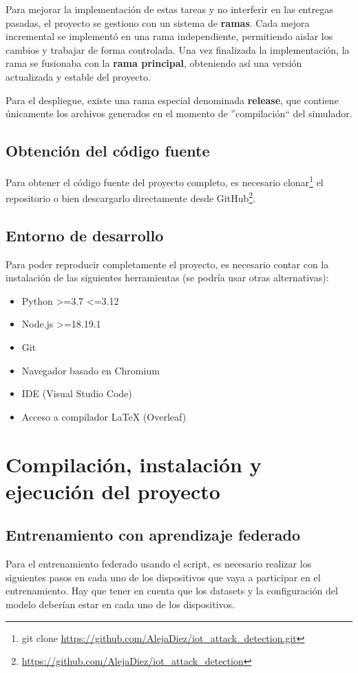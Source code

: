 Para mejorar la implementación de estas tareas y no interferir en las entregas pasadas, el proyecto se gestiono con un sistema de \textbf{ramas}. Cada mejora incremental se implementó en una rama independiente, permitiendo aislar los cambios y trabajar de forma controlada. Una vez finalizada la implementación, la rama se fusionaba con la \textbf{rama principal}, obteniendo así una versión actualizada y estable del proyecto.

Para el despliegue, existe una rama especial denominada \textbf{release}, que contiene únicamente los archivos generados en el momento de ''compilación`` del simulador.

\subsection{Obtención del código fuente}
\label{subsec:CodigoFuente}
Para obtener el código fuente del proyecto completo, es necesario clonar\footnote{git clone \url{https://github.com/AlejaDiez/iot_attack_detection.git}} el repositorio o bien descargarlo directamente desde GitHub\footnote{\url{https://github.com/AlejaDiez/iot_attack_detection}}.

\subsection{Entorno de desarrollo}
\label{subsec:EntornoDesarrollo}
Para poder reproducir completamente el proyecto, es necesario contar con la instalación de las siguientes herramientas (se podría usar otras alternativas):
\begin{itemize}
    \item Python >=3.7 <=3.12
    \item Node.js >=18.19.1
    \item Git
    \item Navegador basado en Chromium
    \item IDE (Visual Studio Code)
    \item Acceso a compilador LaTeX (Overleaf)
\end{itemize}

\section{Compilación, instalación y ejecución del proyecto}
\label{sec:CompilacionInstalacion}
\subsection{Entrenamiento con aprendizaje federado}
\label{subsec:ConfiguracionAprendizajeFederado}
Para el entrenamiento federado usando el script, es necesario realizar los siguientes pasos en cada uno de los dispositivos que vaya a participar en el entrenamiento. Hay que tener en cuenta que los datasets y la configuración del modelo deberían estar en cada uno de los dispositivos.


